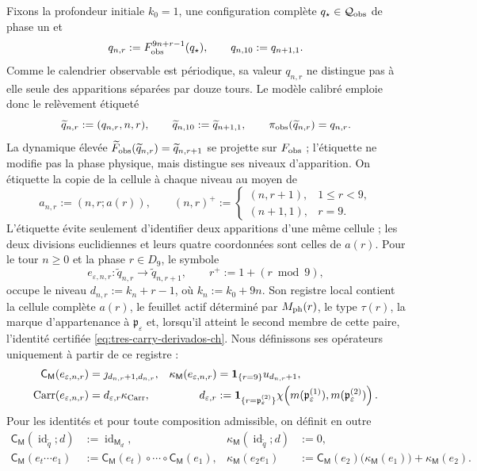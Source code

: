 Fixons la profondeur initiale \(k_0=1\), une configuration complète
\(q_\star\in\mathcal Q_{\rm obs}\) de phase un et
\[
 q_{n,r}:=F_{\rm obs}^{9n+r-1}(q_\star),\qquad
 q_{n,10}:=q_{n+1,1}.
\]
Comme le calendrier observable est périodique, sa valeur \(q_{n,r}\) ne
distingue pas à elle seule des apparitions séparées par douze tours. Le modèle
calibré emploie donc le relèvement étiqueté
\[
 \widetilde q_{n,r}:=(q_{n,r},n,r),\qquad
 \widetilde q_{n,10}:=\widetilde q_{n+1,1},\qquad
 \pi_{\rm obs}(\widetilde q_{n,r})=q_{n,r}.
\]
La dynamique élevée \(\widetilde F_{\rm obs}(\widetilde q_{n,r})
=\widetilde q_{n,r+1}\) se projette sur \(F_{\rm obs}\) ; l'étiquette ne modifie pas la phase physique, mais distingue ses niveaux d'apparition. On étiquette la copie de la cellule à chaque niveau au moyen de
\[
 a_{n,r}:=(n,r;a(r)),\qquad
 (n,r)^+:=
 \begin{cases}
  (n,r+1),&1\le r<9,\\
  (n+1,1),&r=9.
 \end{cases}
\]
L’étiquette évite seulement d’identifier deux apparitions d’une même cellule ; les
deux divisions euclidiennes et leurs quatre coordonnées sont celles de \(a(r)\).
Pour le tour \(n\ge0\) et la phase \(r\in D_9\), le symbole
\[
 e_{\varepsilon,n,r}:\widetilde q_{n,r}
 \longrightarrow\widetilde q_{n,r+1},
 \qquad r^+:=1+(r\bmod9),
\]
occupe le niveau \(d_{n,r}:=k_n+r-1\), où \(k_n:=k_0+9n\). Son registre local contient la cellule complète \(a(r)\), le feuillet actif déterminé par \(M_{\rm ph}(r)\), le type \(\tau(r)\), la marque d'appartenance à \(\mathfrak p_\varepsilon\) et, lorsqu'il atteint le second membre de cette paire, l'identité certifiée \eqref{eq:tres-carry-derivados-ch}. Nous définissons ses opérateurs uniquement à partir de ce registre :
\begin{align}
 \mathsf C_{\mathsf M}(e_{\varepsilon,n,r})
   &=\jmath_{d_{n,r}+1,d_{n,r}},&
 \kappa_{\mathsf M}(e_{\varepsilon,n,r})
   &=\mathbf1_{\{r=9\}}u_{d_{n,r}+1},
 \label{eq:memoria-arista-ch}\\
       \operatorname{Carr}(e_{\varepsilon,n,r})
   &=d_{\varepsilon,r}\kappa_{\rm Carr},&
 d_{\varepsilon,r}
   &:=\mathbf1_{\{r=\mathfrak p_\varepsilon^{(2)}\}}
       \chi\!\left(m(\mathfrak p_\varepsilon^{(1)}),
                    m(\mathfrak p_\varepsilon^{(2)})\right).
 \label{eq:carry-arista-derivado-ch}
\end{align}
Pour les identités et pour toute composition admissible, on définit en outre
\begin{align}
 \mathsf C_{\mathsf M}(\operatorname{id}_{\widetilde q};d)
   &:=\operatorname{id}_{\mathsf M_d},&
 \kappa_{\mathsf M}(\operatorname{id}_{\widetilde q};d)&:=0,
 \label{eq:memoria-identidad-ch}\\
 \mathsf C_{\mathsf M}(e_t\cdots e_1)
   &:=\mathsf C_{\mathsf M}(e_t)\circ\cdots\circ
      \mathsf C_{\mathsf M}(e_1),&
 \kappa_{\mathsf M}(e_2e_1)
   &:=\mathsf C_{\mathsf M}(e_2)
        \bigl(\kappa_{\mathsf M}(e_1)\bigr)
      +\kappa_{\mathsf M}(e_2).
 \label{eq:cociclo-memoria-calibrado-ch}
\end{align}
